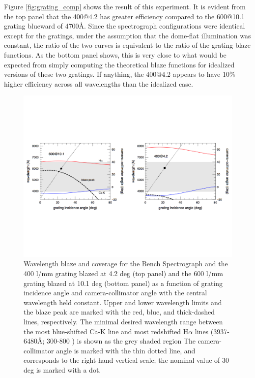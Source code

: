 Figure \ref{fig:grating_comp} shows the result of this experiment. It
is evident from the top panel that the 400@4.2 has greater efficiency
compared to the 600@10.1 grating blueward of 4700\AA. Since the
spectrograph configurations were identical except for the gratings,
under the assumption that the dome-flat illumination was constant, the
ratio of the two curves is equivalent to the ratio of the grating
blaze functions. As the bottom panel shows, this is very close to what
would be expected from simply computing the theoretical blaze
functions for idealized versions of these two gratings. If anything,
the 400@4.2 appears to have 10\% higher efficiency across all
wavelengths than the idealized case.

\begin{figure}[htb]
  \centering
\vskip -1.25in
  \includegraphics[width=\textwidth]{Appendix/figs/blaze_plot_land.pdf}
\vskip -1.25in
\caption[Comparison of coverage and blaze for 400 and 600 l/mm
gratings]{\label{fig:spec_config}\fixspacing Wavelength blaze and
  coverage for the Bench Spectrograph and the 400 l/mm grating blazed
  at 4.2 deg (top panel) and the 600 l/mm grating blazed at 10.1 deg
  (bottom panel) as a function of grating incidence angle and
  camera-collimator angle with the central wavelength held
  constant. Upper and lower wavelength limits and the blaze peak are
  marked with the red, blue, and thick-dashed lines, respectively. The
  minimal desired wavelength range between the most blue-shifted Ca-K
  line and most redshifted H$\alpha$ lines (3937-6480\AA; 300-800
  \kms) is shown as the grey shaded region The camera-collimator angle
  is marked with the thin dotted line, and corresponds to the
  right-hand vertical scale; the nominal value of 30 deg is marked
  with a dot.}
\end{figure}

